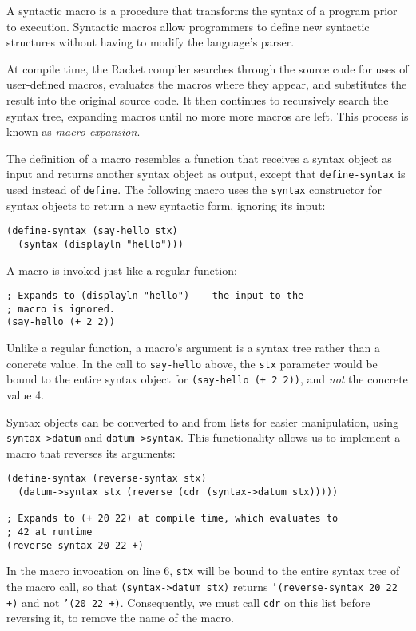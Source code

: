 \documentclass{article}
\begin{document}
A syntactic macro is a procedure that transforms the syntax of a program prior to execution. Syntactic macros allow programmers to define new syntactic structures without having to modify the language's parser.

At compile time, the Racket compiler searches through the source code for uses of user-defined macros, evaluates the macros where they appear, and substitutes the result into the original source code. It then continues to recursively search the syntax tree, expanding macros until no more more macros are left. This process is known as \textit{macro expansion}.

The definition of a macro resembles a function that receives a syntax object as input and returns another syntax object as output, except that \texttt{define-syntax} is used instead of \texttt{define}. The following macro uses the \texttt{syntax} constructor for syntax objects to return a new syntactic form, ignoring its input:

\begin{lstlisting}
(define-syntax (say-hello stx)
  (syntax (displayln "hello")))
\end{lstlisting}

A macro is invoked just like a regular function:

\begin{lstlisting}
; Expands to (displayln "hello") -- the input to the
; macro is ignored.
(say-hello (+ 2 2))
\end{lstlisting}

Unlike a regular function, a macro's argument is a syntax tree rather than a concrete value. In the call to \texttt{say-hello} above, the \texttt{stx} parameter would be bound to the entire syntax object for \texttt{(say-hello (+ 2 2))}, and \textit{not} the concrete value 4.

Syntax objects can be converted to and from lists for easier manipulation, using \texttt{syntax->datum} and \texttt{datum->syntax}. This functionality allows us to implement a macro that reverses its arguments:

\begin{lstlisting}
(define-syntax (reverse-syntax stx)
  (datum->syntax stx (reverse (cdr (syntax->datum stx)))))

; Expands to (+ 20 22) at compile time, which evaluates to
; 42 at runtime
(reverse-syntax 20 22 +)
\end{lstlisting}

In the macro invocation on line 6, \texttt{stx} will be bound to the entire syntax tree of the macro call, so that \texttt{(syntax->datum stx)} returns \texttt{'(reverse-syntax 20 22 +)} and not \texttt{'(20 22 +)}. Consequently, we must call \texttt{cdr} on this list before reversing it, to remove the name of the macro.
\end{document}
